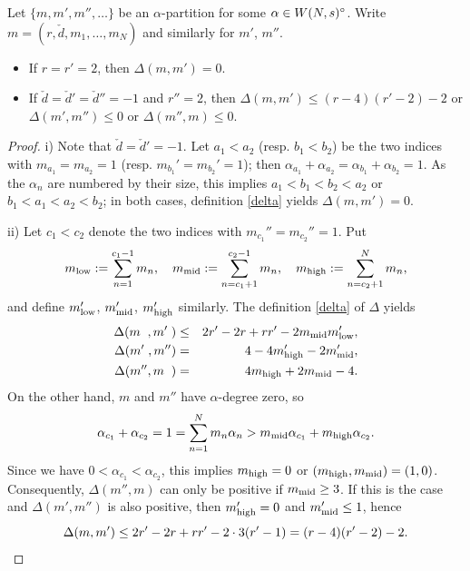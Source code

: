 \documentclass{article}
\begin{document}
\begin{lemma} \label{rank_two}
  Let $\{m, m', m'', \ldots\}$ be an $\alpha$-partition for some $\alpha \in \intW{N, s}$. Write $m = (r, \check{d}, m_1, \ldots, m_N)$ and similarly for
  $m'$, $m''$.
  \begin{itemize}
   \item[i)] If $r = r' = 2$, then $\Delta(m, m') = 0$.
   \item[ii)] If $\check{d} = \check{d}' = \check{d}'' = -1$ and $r'' = 2$, then $\Delta(m,m') \leq (r-4)(r'-2) - 2$ or $\Delta(m',m'') \leq 0$ or
    $\Delta(m'',m) \leq 0$.
  \end{itemize}
\end{lemma}
\begin{proof}
  i) Note that $\check{d} = \check{d}' = -1$. Let $a_1 < a_2$ (resp. $b_1 < b_2$) be the two indices with $m_{a_1} = m_{a_2} = 1$ (resp. $m_{b_1}' =
  m_{b_2}' = 1$); then $\alpha_{a_1} + \alpha_{a_2} = \alpha_{b_1} + \alpha_{b_2} = 1$. As the $\alpha_n$ are numbered by their size, this implies
  $a_1 < b_1 < b_2 < a_2$ or $b_1 < a_1 < a_2 < b_2$; in both cases, definition \ref{delta} yields $\Delta(m, m') = 0$.

  ii) Let $c_1 < c_2$ denote the two indices with $m_{c_1}'' = m_{c_2}'' = 1$. Put
  \begin{displaymath}
    m_{\low} := \sum_{n=1}^{c_1-1} m_n, \quad m_{\middle} := \sum_{n=c_1+1}^{c_2-1} m_n, \quad m_{\high} := \sum_{n=c_2+1}^{N} m_n,
  \end{displaymath}
  and define $m_{\low}'$, $m_{\middle}'$, $m_{\high}'$ similarly. The definition \ref{delta} of $\Delta$ yields
  \begin{eqnarray*}
    \Delta(m\;\;, m'\; ) & \leq & 2r' - 2r + rr' - 2m_{\middle}m_{\low}',\\
    \Delta(m'\; , m''  ) &   =  & 4 - 4m_{\high}' - 2m_{\middle}',\\
    \Delta(m''  , m\;\;) &   =  & 4m_{\high} + 2m_{\middle} - 4.
  \end{eqnarray*}
  On the other hand, $m$ and $m''$ have $\alpha$-degree zero, so
  \begin{displaymath}
    \alpha_{c_1} + \alpha_{c_2} = 1 = \sum_{n=1}^N m_n \alpha_n > m_{\middle} \alpha_{c_1} + m_{\high} \alpha_{c_2}.
  \end{displaymath}
  Since we have $0 < \alpha_{c_1} < \alpha_{c_2}$, this implies $m_{\high} = 0$ or $(m_{\high}, m_{\middle}) = (1, 0)$. Consequently, $\Delta(m'', m)$
  can only be positive if $m_{\middle} \geq 3$. If this is the case and $\Delta(m', m'')$ is also positive, then $m_{\high}' = 0$ and
  $m_{\middle}' \leq 1$, hence
  \begin{displaymath}
    \Delta( m, m') \leq 2r' - 2r + rr' - 2 \cdot 3(r'-1) = (r-4)(r'-2) - 2. \qedhere
  \end{displaymath}
\end{proof}
\end{document}
